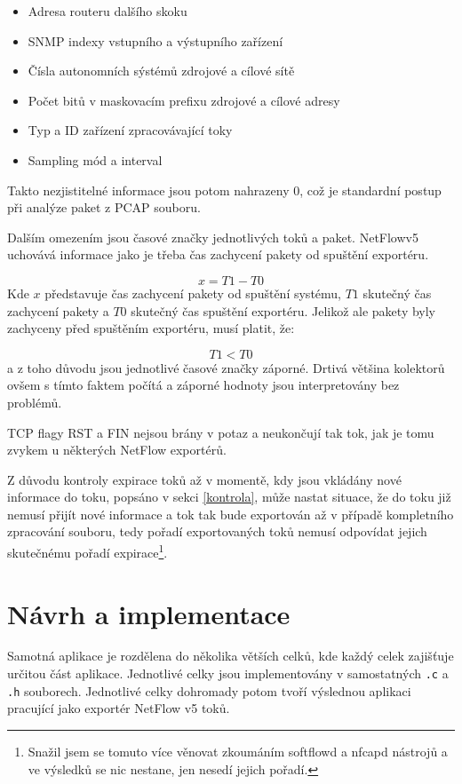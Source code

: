 \documentclass[11pt, a4paper, hidelinks]{article}[08.10.2023]
\begin{document}
    \begin{itemize}
        \item{Adresa routeru dalšího skoku}
        \item{SNMP indexy vstupního a výstupního zařízení}
        \item{Čísla autonomních sýstémů zdrojové a cílové sítě}
        \item{Počet bitů v maskovacím prefixu zdrojové a cílové adresy}
        \item{Typ a ID zařízení zpracovávající toky}
        \item{Sampling mód a interval}
    \end{itemize}

    Takto nezjistitelné informace jsou potom nahrazeny 0, což je standardní postup při analýze paket z PCAP souboru.

    Dalším omezením jsou časové značky jednotlivých toků a paket. NetFlowv5 uchovává informace jako je třeba čas zachycení pakety od spuštění exportéru.


    \begin{equation}
        x = T1 - T0
    \end{equation}
    Kde $x$ představuje čas zachycení pakety od spuštění systému, $T1$ skutečný čas zachycení pakety a $T0$ skutečný čas spuštění exportéru.
    Jelikož ale pakety byly zachyceny před spuštěním exportéru, musí platit, že:

    \begin{equation}
        T1 < T0
    \end{equation}
    a z toho důvodu jsou jednotlivé časové značky záporné. Drtivá většina kolektorů ovšem s tímto faktem počítá a záporné hodnoty jsou interpretovány bez problémů.

    TCP flagy RST a FIN nejsou brány v potaz a neukončují tak tok, jak je tomu zvykem u některých NetFlow exportérů.

    Z důvodu kontroly expirace toků až v momentě, kdy jsou vkládány nové informace do toku, popsáno v sekci \ref{kontrola}, může nastat situace, že do toku již nemusí přijít nové informace a tok tak bude exportován až v případě kompletního zpracování souboru, tedy pořadí exportovaných toků nemusí odpovídat jejich skutečnému pořadí expirace\footnote{Snažil jsem se tomuto více věnovat zkoumáním softflowd a nfcapd nástrojů a ve výsledků se nic nestane, jen nesedí jejich pořadí.}.
    
    \section{Návrh a implementace}
    Samotná aplikace je rozdělena do několika větších celků, kde každý celek zajišťuje určitou část aplikace. Jednotlivé celky jsou implementovány v 
    samostatných \texttt{.c} a \texttt{.h} souborech. Jednotlivé celky dohromady potom tvoří výslednou aplikaci pracující jako exportér
    NetFlow v5 toků.
\end{document}
